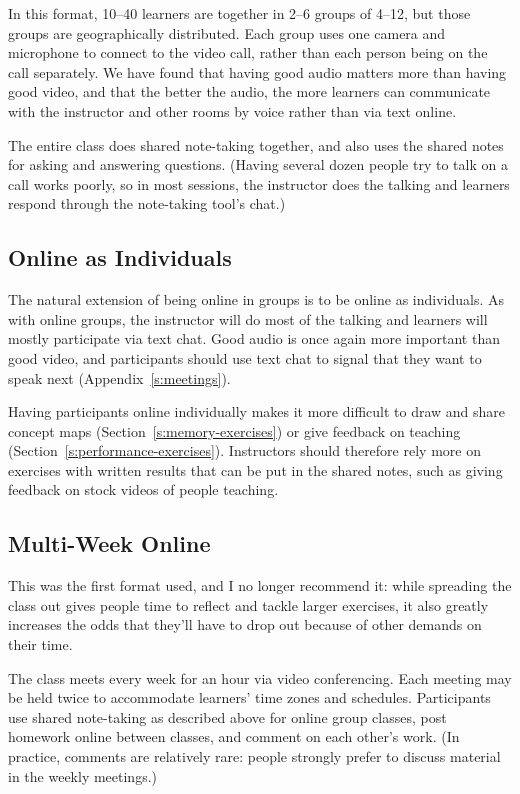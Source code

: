 In this format, 10--40 learners are together in 2--6 groups of 4--12, but
those groups are geographically distributed. Each group uses one camera
and microphone to connect to the video call, rather than each person
being on the call separately. We have found that having good audio
matters more than having good video, and that the better the audio, the
more learners can communicate with the instructor and other rooms by
voice rather than via text online.

The entire class does shared note-taking together, and also uses the
shared notes for asking and answering questions. (Having several dozen
people try to talk on a call works poorly, so in most sessions, the
instructor does the talking and learners respond through the note-taking
tool's chat.)

\subsection{Online as Individuals}\label{online-as-individuals}

The natural extension of being online in groups is to be online as
individuals. As with online groups, the instructor will do most of the
talking and learners will mostly participate via text chat. Good audio
is once again more important than good video, and participants should
use text chat to signal that they want to speak next
(Appendix~\ref{s:meetings}).

Having participants online individually makes it more difficult to draw
and share concept maps (Section~\ref{s:memory-exercises}) or give
feedback on teaching (Section~\ref{s:performance-exercises}). Instructors
should therefore rely more on exercises with written results that can be
put in the shared notes, such as giving feedback on stock videos of
people teaching.

\subsection{Multi-Week Online}\label{multi-week-online}

This was the first format used, and I no longer recommend it: while
spreading the class out gives people time to reflect and tackle larger
exercises, it also greatly increases the odds that they'll have to drop
out because of other demands on their time.

The class meets every week for an hour via video conferencing. Each
meeting may be held twice to accommodate learners' time zones and
schedules. Participants use shared note-taking as described above for
online group classes, post homework online between classes, and comment
on each other's work. (In practice, comments are relatively rare: people
strongly prefer to discuss material in the weekly meetings.)

